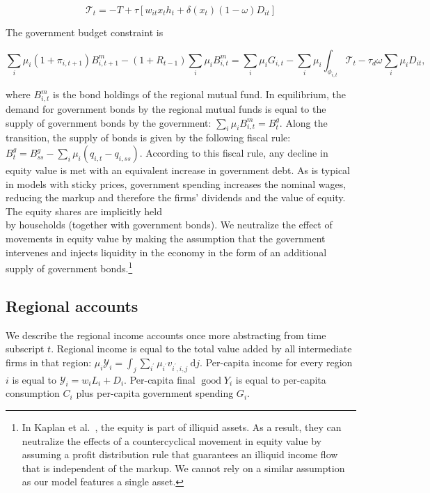 \documentclass[\latexroot/\projectname]{subfiles}
\begin{document}
$$
\mathcal{T}_{t}=-T+\tau\left[w_{i t} x_{t} h_{t}+\delta\left(x_{t}\right)(1-\omega) D_{i t}\right]
$$

The government budget constraint is


\begin{equation*}
\sum_{i} \mu_{i}\left(1+\pi_{i, t+1}\right) B_{i, t+1}^{m}-\left(1+R_{t-1}\right) \sum_{i} \mu_{i} B_{i, t}^{m}=\sum_{i} \mu_{i} G_{i, t}-\sum_{i} \mu_{i} \int_{\phi_{i, t}} \mathcal{T}_{t}-\tau_{d} \omega \sum_{i} \mu_{i} D_{i t}, \tag{4.22}
\end{equation*}


where $B_{i, t}^{m}$ is the bond holdings of the regional mutual fund. In equilibrium, the demand for government bonds by the regional mutual funds is equal to the supply of government bonds by the government: $\sum_{i} \mu_{i} B_{i, t}^{m}=B_{t}^{g}$. Along the transition, the supply of bonds is given by the following fiscal rule: $B_{t}^{g}=B_{s s}^{g}-\sum_{i} \mu_{i}\left(q_{i, t}-q_{i, s s}\right)$. According to this fiscal rule, any decline in equity value is met with an equivalent increase in government debt. As is typical in models with sticky prices, government spending increases the nominal wages, reducing the markup and therefore the firms' dividends and the value of equity. The equity shares are implicitly held\\
by households (together with government bonds). We neutralize the effect of movements in equity value by making the assumption that the government intervenes and injects liquidity in the economy in the form of an additional supply of government bonds.\footnote{In Kaplan et al.~\cite{Kaplan2018-sr}, the equity is part of illiquid assets. As a result, they can neutralize the effects of a countercyclical movement in equity value by assuming a profit distribution rule that guarantees an illiquid income flow that is independent of the markup. We cannot rely on a similar assumption as our model features a single asset.}

\subsection{Regional accounts}
We describe the regional income accounts once more abstracting from time subscript $t$. Regional income is equal to the total value added by all intermediate firms in that region: $\mu_{i} \mathcal{Y}_{i}= \int_{j} \sum_{i^{\prime}} \mu_{i^{\prime}} v_{i^{\prime}, i, j} \mathrm{~d} j$. Per-capita income for every region $i$ is equal to $\mathcal{Y}_{i}=w_{i} L_{i}+D_{i}$. Per-capita final $\operatorname{good} Y_{i}$ is equal to per-capita consumption $C_{i}$ plus per-capita government spending $G_{i}$.
\end{document}
